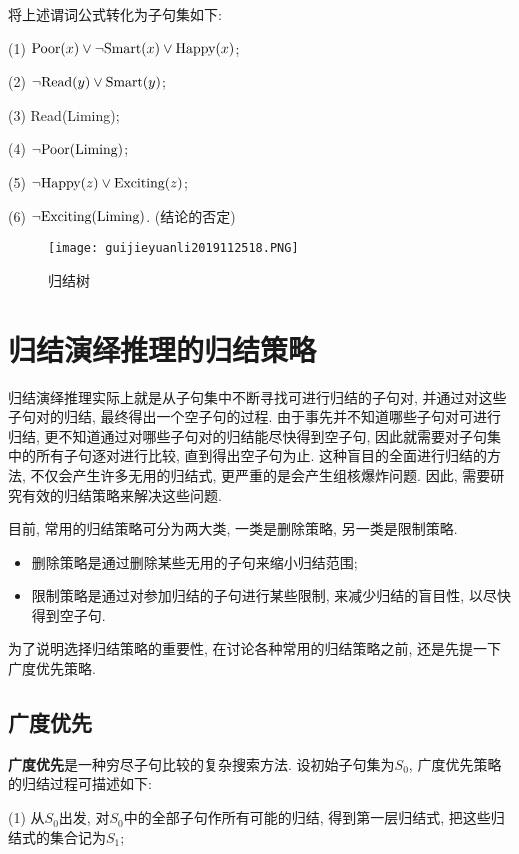 将上述谓词公式转化为子句集如下:

    (1) $\textup{Poor}(x)\vee \neg \textup{Smart}(x)\vee \textup{Happy}(x)$;

    (2) $\neg \textup{Read}(y)\vee \textup{Smart}(y)$;

    (3) \textup{Read}(Liming);

    (4) $\neg \textup{Poor}(\textup{Liming})$;

    (5) $\neg \textup{Happy}(z)\vee \textup{Exciting}(z)$;

    (6) $\neg \textup{Exciting}(\textup{Liming})$. (结论的否定)

\begin{figure}[H]
\centering
\texttt{[image: guijieyuanli2019112518.PNG]}
\caption{归结树}
\label{AI32fig18}
\end{figure}
\section{归结演绎推理的归结策略}
归结演绎推理实际上就是从子句集中不断寻找可进行归结的子句对, 并通过对这些子句对的归结, 最终得出一个空子句的过程. 由于事先并不知道哪些子句对可进行归结, 更不知道通过对哪些子句对的归结能尽快得到空子句, 因此就需要对子句集中的所有子句逐对进行比较, 直到得出空子句为止. 这种盲目的全面进行归结的方法, 不仅会产生许多无用的归结式, 更严重的是会产生组核爆炸问题. 因此, 需要研究有效的归结策略来解决这些问题.

目前, 常用的归结策略可分为两大类, 一类是删除策略, 另一类是限制策略.
\begin{itemize}
\item 删除策略是通过删除某些无用的子句来缩小归结范围;
\item 限制策略是通过对参加归结的子句进行某些限制, 来减少归结的盲目性, 以尽快得到空子句.
\end{itemize}

为了说明选择归结策略的重要性, 在讨论各种常用的归结策略之前, 还是先提一下广度优先策略.
\subsection{广度优先}
\textbf{广度优先}是一种穷尽子句比较的复杂搜索方法. 设初始子句集为$S_0$, 广度优先策略的归结过程可描述如下:

(1) 从$S_0$出发, 对$S_0$中的全部子句作所有可能的归结, 得到第一层归结式, 把这些归结式的集合记为$S_1$;

